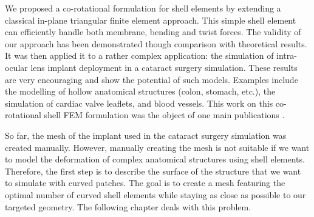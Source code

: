 We proposed a co-rotational formulation for shell elements by extending a classical in-plane triangular finite element approach. This simple shell element can efficiently handle both membrane, bending and twist forces. The validity of our approach has been demonstrated though comparison with theoretical results. It was then applied it to a rather complex application: the simulation of intra-ocular lens implant deployment in a cataract surgery simulation. These results are very encouraging and show the potential of such models. Examples include the modelling of hollow anatomical structures (colon, stomach, etc.), the simulation of cardiac valve leaflets, and blood vessels. This work on this co-rotational shell FEM formulation was the object of one main publications \citep{Comas2010a}.

So far, the mesh of the implant used in the cataract surgery simulation was created manually. However, manually creating the mesh is not suitable if we want to model the deformation of complex anatomical structures using shell elements. Therefore, the first step is to describe the surface of the structure that we want to simulate with curved patches. The goal is to create a mesh featuring the optimal number of curved shell elements while staying as close as possible to our targeted geometry. The following chapter deals with this problem. 
